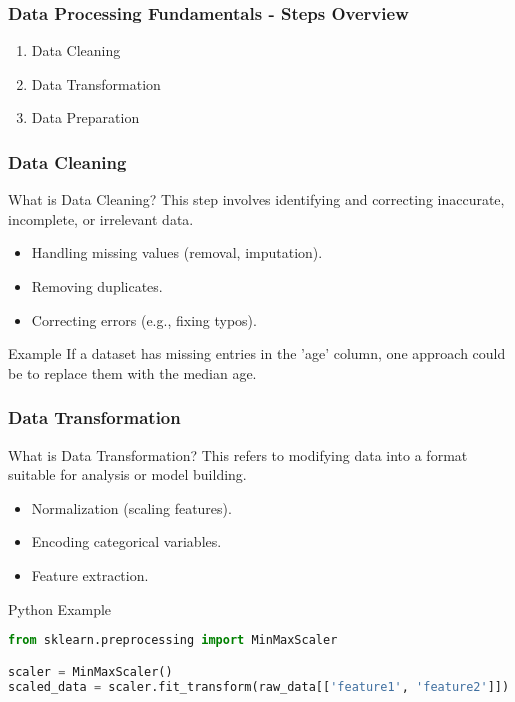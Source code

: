 \documentclass[aspectratio=169]{beamer}
\begin{document}
\begin{frame}[fragile]
    \frametitle{Data Processing Fundamentals - Steps Overview}
    \begin{enumerate}
        \item Data Cleaning
        \item Data Transformation
        \item Data Preparation
    \end{enumerate}
\end{frame}

\begin{frame}[fragile]
    \frametitle{Data Cleaning}
    \begin{block}{What is Data Cleaning?}
        This step involves identifying and correcting inaccurate, incomplete, or irrelevant data.
    \end{block}
    \begin{itemize}
        \item Handling missing values (removal, imputation).
        \item Removing duplicates.
        \item Correcting errors (e.g., fixing typos).
    \end{itemize}
    \begin{block}{Example}
        If a dataset has missing entries in the 'age' column, one approach could be to replace them with the median age.
    \end{block}
\end{frame}

\begin{frame}[fragile]
    \frametitle{Data Transformation}
    \begin{block}{What is Data Transformation?}
        This refers to modifying data into a format suitable for analysis or model building.
    \end{block}
    \begin{itemize}
        \item Normalization (scaling features).
        \item Encoding categorical variables.
        \item Feature extraction.
    \end{itemize}
    \begin{block}{Python Example}
        \begin{lstlisting}[language=Python]
from sklearn.preprocessing import MinMaxScaler

scaler = MinMaxScaler()
scaled_data = scaler.fit_transform(raw_data[['feature1', 'feature2']])
        \end{lstlisting}
    \end{block}
\end{frame}
\end{document}
